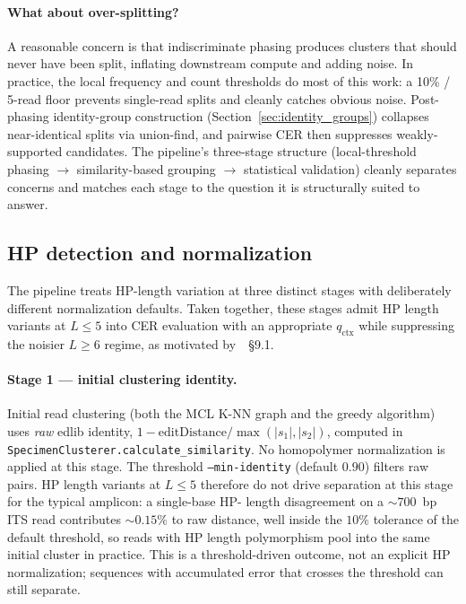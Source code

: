 \documentclass[11pt]{article}
\begin{document}
\paragraph{What about over-splitting?} A reasonable concern is that
indiscriminate phasing produces clusters that should never have been split,
inflating downstream compute and adding noise. In practice, the local
frequency and count thresholds do most of this work: a 10\% / 5-read floor
prevents single-read splits and cleanly catches obvious noise. Post-phasing
identity-group construction (Section~\ref{sec:identity_groups}) collapses
near-identical splits via union-find, and pairwise CER then suppresses
weakly-supported candidates. The pipeline's three-stage structure
(local-threshold phasing $\to$ similarity-based grouping $\to$ statistical
validation) cleanly separates concerns and matches each stage to the
question it is structurally suited to answer.

\subsection{HP detection and normalization}
\label{sec:hp_normalization}

The pipeline treats HP-length variation at three distinct stages with
deliberately different normalization defaults. Taken together, these stages
admit HP length variants at $L \leq 5$ into CER evaluation with an appropriate
$q_\text{ctx}$ while suppressing the noisier $L \geq 6$ regime, as motivated
by~\cite{hp_paper}~\S 9.1.

\paragraph{Stage 1 --- initial clustering identity.} Initial read clustering
(both the MCL K-NN graph and the greedy algorithm) uses \emph{raw} edlib
identity, $1 - \mathrm{editDistance}/\max(|s_1|,|s_2|)$, computed in
\texttt{SpecimenClusterer.calculate\_similarity}. No homopolymer normalization
is applied at this stage. The threshold \texttt{--min-identity} (default
$0.90$) filters raw pairs. HP length variants at $L \leq 5$ therefore do not
drive separation at this stage for the typical amplicon: a single-base HP-
length disagreement on a $\sim\!700$~bp ITS read contributes $\sim\!0.15\%$ to
raw distance, well inside the $10\%$ tolerance of the default threshold, so
reads with HP length polymorphism pool into the same initial cluster in
practice. This is a threshold-driven outcome, not an explicit HP
normalization; sequences with accumulated error that crosses the threshold
can still separate.
\end{document}
